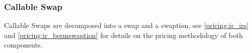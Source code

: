 \subsubsection{Callable Swap}
\label{pricing:ir_callabeswap}

Callable Swaps are decomposed into a swap and a swaption, see \ref{pricing:ir_irs} and \ref{pricing:ir_bermswaption} for
details on the pricing methodology of both components.

